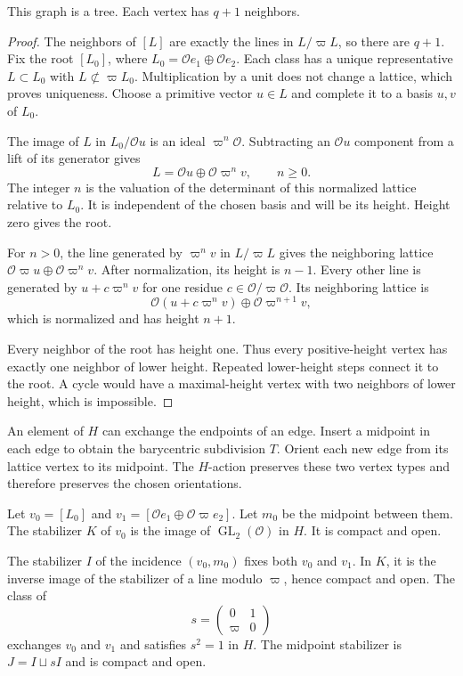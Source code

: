 \begin{lemma}\label{v4-arith:ic:w10-d:fixed-center:lem:tree}
This graph is a tree.
Each vertex has $q+1$ neighbors.
\end{lemma}
\begin{proof}
The neighbors of $[L]$ are exactly the lines in $L/\varpi L$, so there are $q+1$.
Fix the root $[L_0]$, where $L_0=\mathcal O e_1\oplus\mathcal O e_2$.
Each class has a unique representative $L\subset L_0$ with $L\not\subset\varpi L_0$.
Multiplication by a unit does not change a lattice, which proves uniqueness.
Choose a primitive vector $u\in L$ and complete it to a basis $u,v$ of $L_0$.

The image of $L$ in $L_0/\mathcal O u$ is an ideal $\varpi^n\mathcal O$.
Subtracting an $\mathcal O u$ component from a lift of its generator gives
\[
 L=\mathcal O u\oplus\mathcal O\varpi^n v,\qquad n\ge0.
\]
The integer $n$ is the valuation of the determinant of this normalized lattice relative to $L_0$.
It is independent of the chosen basis and will be its height.
Height zero gives the root.

For $n>0$, the line generated by $\varpi^n v$ in $L/\varpi L$
gives the neighboring lattice
$\mathcal O\varpi u\oplus\mathcal O\varpi^n v$.
After normalization, its height is $n-1$.
Every other line is generated by $u+c\varpi^n v$ for one residue $c\in\mathcal O/\varpi\mathcal O$.
Its neighboring lattice is
\[
 \mathcal O(u+c\varpi^n v)\oplus\mathcal O\varpi^{n+1}v,
\]
which is normalized and has height $n+1$.

Every neighbor of the root has height one.
Thus every positive-height vertex has exactly one neighbor of lower height.
Repeated lower-height steps connect it to the root.
A cycle would have a maximal-height vertex with two neighbors of lower height, which is impossible.
\end{proof}

An element of $H$ can exchange the endpoints of an edge.
Insert a midpoint in each edge to obtain the barycentric subdivision $T$.
Orient each new edge from its lattice vertex to its midpoint.
The $H$-action preserves these two vertex types and therefore preserves the chosen orientations.

Let $v_0=[L_0]$ and $v_1=[\mathcal O e_1\oplus\mathcal O\varpi e_2]$.
Let $m_0$ be the midpoint between them.
The stabilizer $K$ of $v_0$ is the image of $\operatorname{GL}_2(\mathcal O)$ in $H$.
It is compact and open.

The stabilizer $I$ of the incidence $(v_0,m_0)$ fixes both $v_0$ and $v_1$.
In $K$, it is the inverse image of the stabilizer of a line modulo $\varpi$, hence compact and open.
The class of
\[
 s=\begin{pmatrix}0&1\\\varpi&0\end{pmatrix}
\]
exchanges $v_0$ and $v_1$ and satisfies $s^2=1$ in $H$.
The midpoint stabilizer is $J=I\sqcup sI$ and is compact and open.

